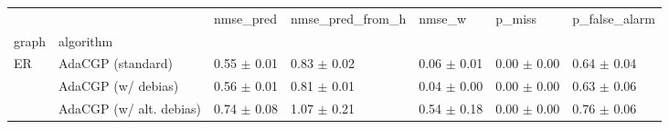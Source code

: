 \begin{tabular}{lllllll}
\toprule
   &                         &        nmse_pred & nmse_pred_from_h &           nmse_w &           p_miss &    p_false_alarm \\
graph & algorithm &                  &                  &                  &                  &                  \\
\midrule
ER & AdaCGP (standard) &  0.55 $\pm$ 0.01 &  0.83 $\pm$ 0.02 &  0.06 $\pm$ 0.01 &  0.00 $\pm$ 0.00 &  0.64 $\pm$ 0.04 \\
   & AdaCGP (w/ debias) &  0.56 $\pm$ 0.01 &  0.81 $\pm$ 0.01 &  0.04 $\pm$ 0.00 &  0.00 $\pm$ 0.00 &  0.63 $\pm$ 0.06 \\
   & AdaCGP (w/ alt. debias) &  0.74 $\pm$ 0.08 &  1.07 $\pm$ 0.21 &  0.54 $\pm$ 0.18 &  0.00 $\pm$ 0.00 &  0.76 $\pm$ 0.06 \\
\bottomrule
\end{tabular}
